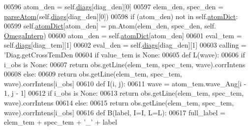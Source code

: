 \begin{DoxyCode}
{{{{00596         atom\_den = self.\hyperlink{classpyneb_1_1core_1_1diags_1_1_diagnostics_a0c0f7e36097677f61a6a14a0c3127b02}{diags}[diag\_den][0]
00597         elem\_den, spec\_den = \hyperlink{namespacepyneb_1_1utils_1_1misc_a8c069186002a3e73dd474958e35034d5}{parseAtom}(self.\hyperlink{classpyneb_1_1core_1_1diags_1_1_diagnostics_a0c0f7e36097677f61a6a14a0c3127b02}{diags}[diag\_den][0])
00598         \textcolor{keywordflow}{if} (atom\_den) \textcolor{keywordflow}{not} \textcolor{keywordflow}{in} self.\hyperlink{classpyneb_1_1core_1_1diags_1_1_diagnostics_a36301f268745b33abe6cfeb3e41a6356}{atomDict}:
00599             self.\hyperlink{classpyneb_1_1core_1_1diags_1_1_diagnostics_a36301f268745b33abe6cfeb3e41a6356}{atomDict}[atom\_den] = pn.Atom(elem\_den, spec\_den, self.
      \hyperlink{classpyneb_1_1core_1_1diags_1_1_diagnostics_acfd0638b293790832bcee3cd9f3ec342}{OmegaInterp})
00600         atom\_den = self.\hyperlink{classpyneb_1_1core_1_1diags_1_1_diagnostics_a36301f268745b33abe6cfeb3e41a6356}{atomDict}[atom\_den]
00601         eval\_tem = self.\hyperlink{classpyneb_1_1core_1_1diags_1_1_diagnostics_a0c0f7e36097677f61a6a14a0c3127b02}{diags}[diag\_tem][1]
00602         eval\_den = self.\hyperlink{classpyneb_1_1core_1_1diags_1_1_diagnostics_a0c0f7e36097677f61a6a14a0c3127b02}{diags}[diag\_den][1]
00603         calling = \textcolor{stringliteral}{'Diag.getCrossTemDen %
00604         \textcolor{keywordflow}{if} value\_tem \textcolor{keywordflow}{is} \textcolor{keywordtype}{None}:
00605             \textcolor{keyword}{def }L(wave):
00606                 \textcolor{keywordflow}{if} i\_obs \textcolor{keywordflow}{is} \textcolor{keywordtype}{None}:
00607                     \textcolor{keywordflow}{return} obs.getLine(elem\_tem, spec\_tem, wave).corrIntens
00608                 \textcolor{keywordflow}{else}:
00609                     \textcolor{keywordflow}{return} obs.getLine(elem\_tem, spec\_tem, wave).corrIntens[i\_obs]
00610             \textcolor{keyword}{def }I(i, j):
00611                 wave = atom\_tem.wave\_Ang[i - 1, j - 1]
00612                 \textcolor{keywordflow}{if} i\_obs \textcolor{keywordflow}{is} \textcolor{keywordtype}{None}:
00613                     \textcolor{keywordflow}{return} obs.getLine(elem\_tem, spec\_tem, wave).corrIntens
00614                 \textcolor{keywordflow}{else}:
00615                     \textcolor{keywordflow}{return} obs.getLine(elem\_tem, spec\_tem, wave).corrIntens[i\_obs]
00616             \textcolor{keyword}{def }B(label, I=I, L=L):
00617                 full\_label = elem\_tem + spec\_tem + \textcolor{stringliteral}{'\_'} + label
}}}}}
\end{DoxyCode}
